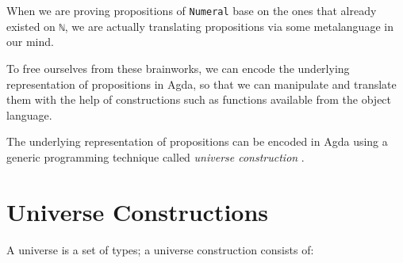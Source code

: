 \documentclass[\main/thesis.tex]{subfiles}
\begin{document}
When we are proving propositions of \lstinline|Numeral| base on the ones that
already existed on \lstinline|ℕ|, we are actually translating propositions via
some metalanguage in our mind.

To free ourselves from these brainworks, we can encode the
underlying representation of propositions in Agda,
so that we can manipulate and translate them with the
help of constructions such as functions available from the object language.

\begin{center}
    \begin{adjustbox}{max width=\textwidth}
    \end{adjustbox}
\end{center}

The underlying representation of propositions can be encoded in Agda
using a generic programming technique called \textit{universe construction}
\cite{norell2009dependently}.

\section{Universe Constructions}

A universe is a set of types;
a universe construction consists of:
\end{document}

